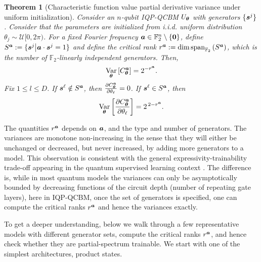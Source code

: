 \documentclass{article}
\theoremstyle{plain}
\newtheorem{theorem}{Theorem}[section]
\theoremstyle{definition}
\theoremstyle{remark}
\begin{document}
\begin{theorem}[Characteristic function value partial derivative variance under uniform initialization]
\label{thm:uniform}
Consider an $n$-qubit IQP-QCBM $U_{\bm{\theta}}$ with generators $\{{\bm{s}^j}\}$. Consider that the parameters are initialized from i.i.d. uniform distribution $\theta_j \sim\mathcal{U}[0,2\pi)$. For a fixed Fourier frequency ${\bm{a}} \in \mathbb{F}_2^n \setminus \{\mathbf{0}\}$, define $S^{{\bm{a}}} := \{ {\bm{s}^j} \big| {\bm{a}} \cdot {\bm{s}^j} = 1 \}$ and define the critical rank $r^{\bm{a}} := \dim \operatorname{span}_{\mathbb{F}_2}\left( S^{{\bm{a}}} \right)$, which is the number of $\mathbb{F}_2$-linearly independent generators. Then, \begin{equation}
\operatorname*{Var}_{{\bm{\theta}}} \left[ C^{\bm{a}}_{\bm{\theta}}\right] = 2^{-r^{\bm{a}}}. 
\end{equation} Fix $1\leq l \leq D$. If ${\bm{s}^\ell} \notin S^{\bm{a}}$, then $ \frac{\partial C^{\bm{a}}_{\bm{\theta}}}{\partial \theta_\ell}=0$. If ${\bm{s}^\ell} \in S^{\bm{a}}$, then
\begin{equation}
\operatorname*{Var}_{{\bm{\theta}}} \left[ \frac{\partial C^{\bm{a}}_{\bm{\theta}}}{\partial \theta_\ell} \right] = 2^{\,2-r^{\bm{a}}}. \end{equation}
\end{theorem}

The quantities $r^{\bm{a}}$ depends on ${\bm{a}}$, and the type and number of generators. The variances are monotone non-increasing in the sense that they will either be unchanged or decreased, but never increased, by adding more generators to a model. This observation is consistent with the general expressivity-trainability trade-off appearing in the quantum supervised learning context \cite{mcclean18, Holmes22}. The difference is, while in most quantum models the variances can only be asymptotically bounded by decreasing functions of the circuit depth (number of repeating gate layers), here in IQP-QCBM, once the set of generators is specified, one can compute the critical ranks $r^{\bm{a}}$ and hence the variances exactly.  

To get a deeper understanding, below we walk through a few representative models with different generator sets, compute the critical ranks $r^{\bm{a}}$, and hence check whether they are partial-spectrum trainable. We start with one of the simplest architectures, product states.
\end{document}
